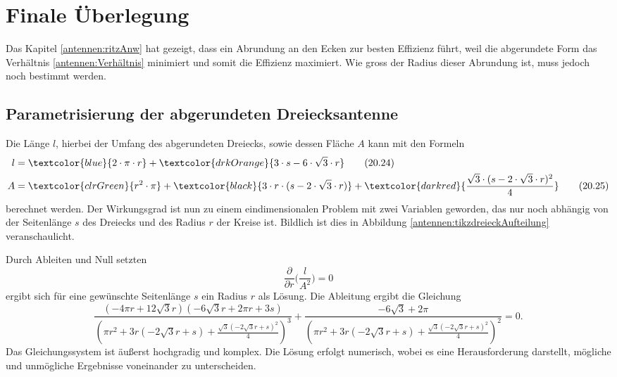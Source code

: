 %
%
% 
%
%
\section{Finale Überlegung\label{antennen:resultat}}

Das Kapitel \ref{antennen:ritzAnw} hat gezeigt, dass ein Abrundung an den Ecken
zur besten Effizienz führt, weil die abgerundete Form das Verhältnis \eqref{antennen:Verhältnis}
minimiert und somit die Effizienz maximiert. Wie gross der Radius dieser Abrundung
ist, muss jedoch noch bestimmt werden.


\subsection{Parametrisierung der abgerundeten Dreiecksantenne\label{antennen:param3eck}}
Die Länge $l$, hierbei der Umfang 
des abgerundeten Dreiecks, sowie dessen Fläche $A$ kann mit den Formeln
\begin{align}
	l &= \textcolor{blue}{2 \cdot \pi \cdot r} + \textcolor{drkOrange}{3 \cdot s - 6 \cdot \sqrt{3} \cdot r} \tag{20.24} \label{antennen:Länge} \\
	A &= \textcolor{clrGreen}{r^2 \cdot \pi} + \textcolor{black}{3 \cdot r \cdot (s - 2 \cdot \sqrt{3} \cdot r)} + \textcolor{darkred}{\frac{\sqrt{3} \cdot (s - 2 \cdot \sqrt{3} \cdot r)^2}{4}} \tag{20.25} \label{antennen:Fläche}
\end{align}\setcounter{equation}{25}%
berechnet werden.
Der Wirkungsgrad ist nun zu einem eindimensionalen Problem mit zwei Variablen geworden, das nur noch abhängig von 
der Seitenlänge $s$ des Dreiecks und des Radius $r$ der Kreise ist. Bildlich ist dies 
in Abbildung \ref{antennen:tikzdreieckAufteilung} veranschaulicht.


Durch Ableiten und Null setzten
\begin{equation}
	\frac{\partial}{\partial{r}} \bigg(\frac{l}{A^2}\bigg)=0
	\label{antennen:Ableitung}
\end{equation}
ergibt sich für eine gewünschte Seitenlänge $s$ ein Radius $r$ als Lösung. 
Die Ableitung ergibt die Gleichung 
\begin{equation}
	\frac{(- 4 \pi r + 12 \sqrt{3} r) (- 6 \sqrt{3} r + 2 \pi r + 3 s)}{\left(\pi r^{2} + 3 r (- 2 \sqrt{3} r + s) + \frac{\sqrt{3} \left(- 2 \sqrt{3} r + s\right)^{2}}{4}\right)^{3}} + \frac{- 6 \sqrt{3} + 2 \pi}{\left(\pi r^{2} + 3 r (- 2 \sqrt{3} r + s) + \frac{\sqrt{3} \left(- 2 \sqrt{3} r + s\right)^{2}}{4}\right)^{2}}=0.
	\label{antennen:Ableitunggelöst}
\end{equation}
Das Gleichungssystem ist äußerst hochgradig und komplex. Die Lösung erfolgt numerisch, 
wobei es eine Herausforderung darstellt, mögliche und unmögliche Ergebnisse voneinander zu unterscheiden.

